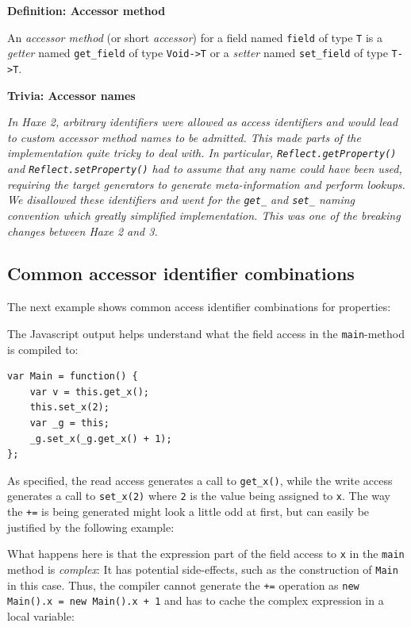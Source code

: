\documentclass[a4paper,oneside]{book}
\newcommand{\target}[1]{#1}
\newcommand{\type}[1]{\texttt{#1}}
\newcommand{\expr}[1]{\texttt{#1}}
\newenvironment{myshaded}
  {\def\FrameCommand{\fboxsep=\topsep\colorbox{bgcolor}}%
  \MakeFramed {\advance\hsize-\width \FrameRestore}}%
 {\endMakeFramed}
\newcommand{\define}[3][Definition]
	{\begin{myshaded}\noindent\textbf{#1: #2}\par\nobreak\noindent\ignorespaces#3\label{def:#2}\end{myshaded}}
\newcommand{\trivia}[2]
	{\begin{myshaded}\noindent\textbf{Trivia: #1}\par\nobreak\noindent\ignorespaces\textit{#2}\end{myshaded}}
\newcommand{\haxe}[2][]{%
}
\begin{document}
\define{Accessor method}{An \emph{accessor method} (or short \emph{accessor}) for a field named \expr{field} of type \type{T} is a \emph{getter} named \expr{get_field} of type \type{Void->T} or a \emph{setter} named \expr{set_field} of type \type{T->T}.}

\trivia{Accessor names}{In Haxe 2, arbitrary identifiers were allowed as access identifiers and would lead to custom accessor method names to be admitted. This made parts of the implementation quite tricky to deal with. In particular, \expr{Reflect.getProperty()} and \expr{Reflect.setProperty()} had to assume that any name could have been used, requiring the target generators to generate meta-information and perform lookups.\\
We disallowed these identifiers and went for the \expr{get_} and \expr{set_} naming convention which greatly simplified implementation. This was one of the breaking changes between Haxe 2 and 3.}

\subsection{Common accessor identifier combinations}
\label{class-field-property-common-combinations}

The next example shows common access identifier combinations for properties:

\haxe{assets/Property2.hx}

The \target{Javascript} output helps understand what the field access in the \expr{main}-method is compiled to:

\begin{lstlisting}
var Main = function() {
	var v = this.get_x();
	this.set_x(2);
	var _g = this;
	_g.set_x(_g.get_x() + 1);
};
\end{lstlisting}

As specified, the read access generates a call to \expr{get_x()}, while the write access generates a call to \expr{set_x(2)} where \expr{2} is the value being assigned to \expr{x}. The way the \expr{+=} is being generated might look a little odd at first, but can easily be justified by the following example:

\haxe{assets/Property3.hx}

What happens here is that the expression part of the field access to \expr{x} in the \expr{main} method is \emph{complex}: It has potential side-effects, such as the construction of \type{Main} in this case. Thus, the compiler cannot generate the \expr{+=} operation as \expr{new Main().x = new Main().x + 1} and has to cache the complex expression in a local variable:
\end{document}
